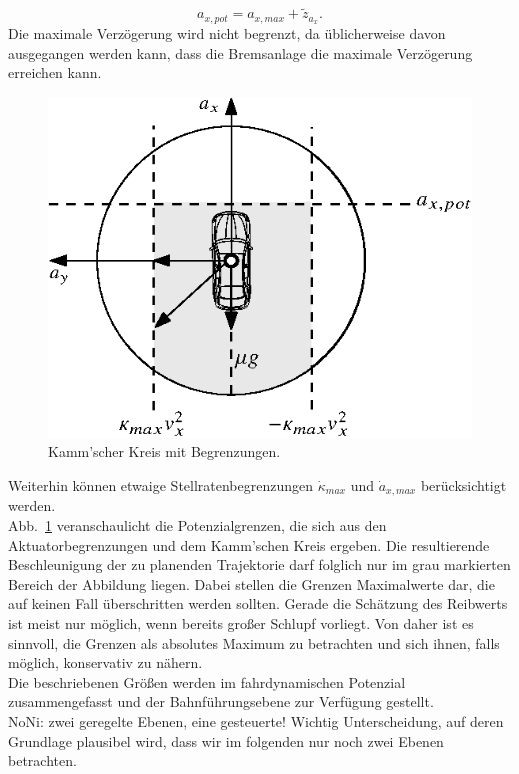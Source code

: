 \begin{equation}
a_{x,pot} = a_{x,max} + \tilde z_{a_x}.
\end{equation}
Die maximale Verzögerung wird nicht begrenzt, da üblicherweise davon ausgegangen werden kann, dass die Bremsanlage die maximale Verzögerung erreichen kann.
	   \begin{figure}[thpb]
	      \centering
	  \includegraphics{Bilder/02/pot_vec.eps}
	 \begin{center}
	       \caption{Kamm'scher Kreis mit Begrenzungen.}
	      \label{abb_pot_vec}
	       \end{center}
	   \end{figure} 
Weiterhin können etwaige Stellratenbegrenzungen $\dot \kappa_{max}$ und $\dot a_{x,max}$ berücksichtigt werden.\\
Abb.~\ref{abb_pot_vec} veranschaulicht die Potenzialgrenzen, die sich aus den Aktuatorbegrenzungen und dem Kamm'schen Kreis ergeben. Die resultierende Beschleunigung der zu planenden Trajektorie darf folglich nur im grau markierten Bereich der Abbildung liegen. Dabei stellen die Grenzen Maximalwerte dar, die auf keinen Fall überschritten werden sollten. Gerade die Schätzung des Reibwerts ist meist nur möglich, wenn bereits großer Schlupf vorliegt. Von daher ist es sinnvoll, die Grenzen als absolutes Maximum zu betrachten und sich ihnen, falls möglich, konservativ zu nähern.\\
Die beschriebenen Größen werden im fahrdynamischen Potenzial zusammengefasst und der Bahnführungsebene zur Verfügung gestellt.\\
 NoNi: zwei geregelte Ebenen, eine gesteuerte! Wichtig Unterscheidung, auf deren Grundlage plausibel wird, dass wir im folgenden nur noch zwei Ebenen betrachten.
\FloatBarrier


